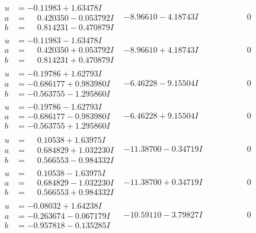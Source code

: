 \documentclass[1p]{elsarticle_modified}
\theoremstyle{definition}
\begin{document}
$$\begin{array}{c|c|c}
\begin{aligned}
u &= -0.11983 + 1.63478 I \\
a &= \phantom{-}0.420350 - 0.053792 I \\
b &= \phantom{-}0.814231 - 0.470879 I\end{aligned}
 & -8.96610 - 4.18743 I & \phantom{-0.000000 } 0 \\ \hline\begin{aligned}
u &= -0.11983 - 1.63478 I \\
a &= \phantom{-}0.420350 + 0.053792 I \\
b &= \phantom{-}0.814231 + 0.470879 I\end{aligned}
 & -8.96610 + 4.18743 I & \phantom{-0.000000 } 0 \\ \hline\begin{aligned}
u &= -0.19786 + 1.62793 I \\
a &= -0.686177 + 0.983980 I \\
b &= -0.563755 - 1.295860 I\end{aligned}
 & -6.46228 - 9.15504 I & \phantom{-0.000000 } 0 \\ \hline\begin{aligned}
u &= -0.19786 - 1.62793 I \\
a &= -0.686177 - 0.983980 I \\
b &= -0.563755 + 1.295860 I\end{aligned}
 & -6.46228 + 9.15504 I & \phantom{-0.000000 } 0 \\ \hline\begin{aligned}
u &= \phantom{-}0.10538 + 1.63975 I \\
a &= \phantom{-}0.684829 + 1.032230 I \\
b &= \phantom{-}0.566553 - 0.984332 I\end{aligned}
 & -11.38700 - 0.34719 I & \phantom{-0.000000 } 0 \\ \hline\begin{aligned}
u &= \phantom{-}0.10538 - 1.63975 I \\
a &= \phantom{-}0.684829 - 1.032230 I \\
b &= \phantom{-}0.566553 + 0.984332 I\end{aligned}
 & -11.38700 + 0.34719 I & \phantom{-0.000000 } 0 \\ \hline\begin{aligned}
u &= -0.08032 + 1.64238 I \\
a &= -0.263674 - 0.067179 I \\
b &= -0.957818 - 0.135285 I\end{aligned}
 & -10.59110 - 3.79827 I & \phantom{-0.000000 } 0 \\ \hline\begin{aligned}

\end{aligned}
\end{array}$$
\end{document}
